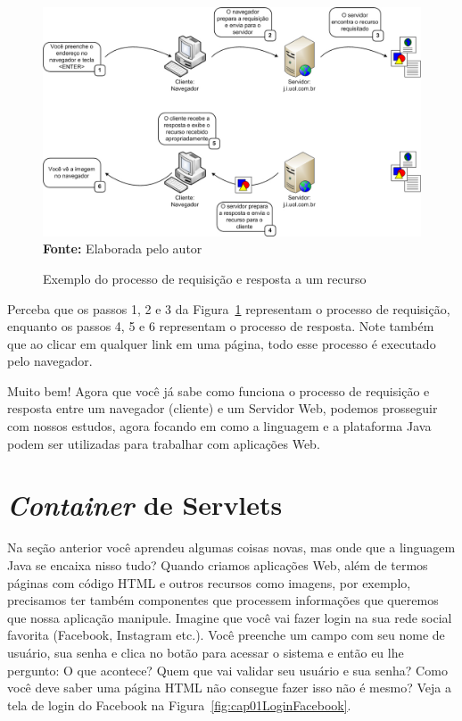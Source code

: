 \FloatBarrier
\begin{figure}[!htbp]
    \centering
    \caption{Exemplo do processo de requisição e resposta a um recurso}
    \includegraphics[scale=0.38]{imagens/cap01ExemploRequestResponse}
    \\\textbf{Fonte:} Elaborada pelo autor
    \label{fig:cap01ExemploRequestResponse}
\end{figure}
\FloatBarrier

Perceba que os passos 1, 2 e 3 da Figura~\ref{fig:cap01ExemploRequestResponse} representam o processo de requisição, enquanto os passos 4, 5 e 6 representam o processo de resposta. Note também que ao clicar em qualquer link em uma página, todo esse processo é executado pelo navegador.

Muito bem! Agora que você já sabe como funciona o processo de requisição e resposta entre um navegador (cliente) e um Servidor Web, podemos prosseguir com nossos estudos, agora focando em como a linguagem e a plataforma Java podem ser utilizadas para trabalhar com aplicações Web.


\section{\textit{Container} de Servlets}

Na seção anterior você aprendeu algumas coisas novas, mas onde que a linguagem Java se encaixa nisso tudo? Quando criamos aplicações Web, além de termos páginas com código HTML e outros recursos como imagens, por exemplo, precisamos ter também componentes que processem informações que queremos que nossa aplicação manipule. Imagine que você vai fazer login na sua rede social favorita (Facebook, Instagram etc.). Você preenche um campo com seu nome de usuário, sua senha e clica no botão para acessar o sistema e então eu lhe pergunto: O que acontece? Quem que vai validar seu usuário e sua senha? Como você deve saber uma página HTML não consegue fazer isso não é mesmo? Veja a tela de login do Facebook na Figura~\ref{fig:cap01LoginFacebook}.

